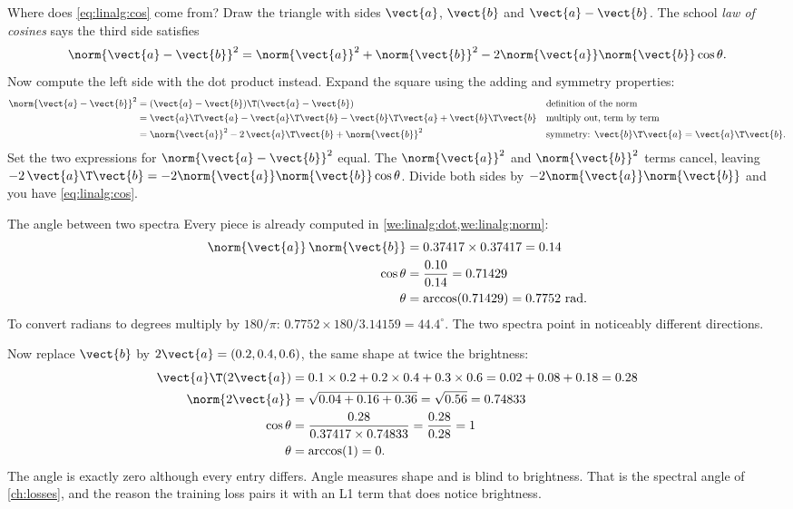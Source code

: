 Where does \cref{eq:linalg:cos} come from? Draw the triangle with sides $\vect{a}$, $\vect{b}$
and $\vect{a}-\vect{b}$. The school \emph{law of cosines} says the third side satisfies
\[
\norm{\vect{a}-\vect{b}}^2 = \norm{\vect{a}}^2 + \norm{\vect{b}}^2
  - 2\norm{\vect{a}}\norm{\vect{b}}\cos\theta .
\]
Now compute the left side with the dot product instead. Expand the square using the adding and
symmetry properties:
\begin{align*}
\norm{\vect{a}-\vect{b}}^2
&= (\vect{a}-\vect{b})\T(\vect{a}-\vect{b})
  && \text{definition of the norm}\\
&= \vect{a}\T\vect{a} - \vect{a}\T\vect{b} - \vect{b}\T\vect{a} + \vect{b}\T\vect{b}
  && \text{multiply out, term by term}\\
&= \norm{\vect{a}}^2 - 2\,\vect{a}\T\vect{b} + \norm{\vect{b}}^2
  && \text{symmetry: } \vect{b}\T\vect{a} = \vect{a}\T\vect{b}.
\end{align*}
Set the two expressions for $\norm{\vect{a}-\vect{b}}^2$ equal. The $\norm{\vect{a}}^2$ and
$\norm{\vect{b}}^2$ terms cancel, leaving
$-2\,\vect{a}\T\vect{b} = -2\norm{\vect{a}}\norm{\vect{b}}\cos\theta$. Divide both sides by
$-2\norm{\vect{a}}\norm{\vect{b}}$ and you have \cref{eq:linalg:cos}.

\begin{worked}[label={we:linalg:angle}]{The angle between two spectra}
Every piece is already computed in \cref{we:linalg:dot,we:linalg:norm}:
\begin{align*}
\norm{\vect{a}}\,\norm{\vect{b}} &= 0.37417 \times 0.37417 = 0.14\\
\cos\theta &= \frac{0.10}{0.14} = 0.71429\\
\theta &= \arccos(0.71429) = 0.7752\ \text{rad}.
\end{align*}
To convert radians to degrees multiply by $180/\pi$:
$0.7752 \times 180 / 3.14159 = 44.4^\circ$. The two spectra point in noticeably different directions.

Now replace $\vect{b}$ by $2\vect{a} = (0.2, 0.4, 0.6)$, the same shape at twice the brightness:
\begin{align*}
\vect{a}\T(2\vect{a}) &= 0.1\times0.2 + 0.2\times0.4 + 0.3\times0.6 = 0.02 + 0.08 + 0.18 = 0.28\\
\norm{2\vect{a}} &= \sqrt{0.04 + 0.16 + 0.36} = \sqrt{0.56} = 0.74833\\
\cos\theta &= \frac{0.28}{0.37417 \times 0.74833} = \frac{0.28}{0.28} = 1\\
\theta &= \arccos(1) = 0 .
\end{align*}
The angle is exactly zero although every entry differs. Angle measures shape and is blind to
brightness. That is the spectral angle of \cref{ch:losses}, and the reason the training loss
pairs it with an L1 term that does notice brightness.
\end{worked}

